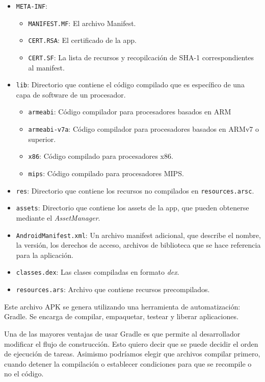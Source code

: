 \begin{itemize}
\item \texttt{META-INF}:
  \begin{itemize}
  \item \texttt{MANIFEST.MF}: El archivo Manifest.
  \item \texttt{CERT.RSA}: El certificado de la app.
  \item \texttt{CERT.SF}: La lista de recursos y recopilcación de SHA-1
    correspondientes al manifest.
  \end{itemize}
\item \texttt{lib}: Directorio que contiene el código compilado que es
  específico de una capa de software de un procesador.
  \begin{itemize}
  \item \texttt{armeabi}: Código compilador para procesadores basados en ARM
  \item \texttt{armeabi-v7a}: Código compilador para procesadores basados en
    ARMv7 o superior.
  \item \texttt{x86}: Código compilado para procesadores x86.
  \item \texttt{mips}: Código compilado para procesadores MIPS.
  \end{itemize}
\item \texttt{res}: Directorio que contiene los recursos no compilados en
  \texttt{resources.arsc}.
\item \texttt{assets}: Directorio que contiene los assets de la app, que pueden
  obtenerse mediante el \textit{AssetManager}.
\item \texttt{AndroidManifest.xml}: Un archivo manifest adicional, que describe
  el nombre, la versión, los derechos de acceso, archivos de biblioteca que se
  hace referencia para la aplicación.
\item \texttt{classes.dex}: Las clases compiladas en formato \textit{dex}.
\item \texttt{resources.ars}: Archivo que contiene recursos precompilados.
\end{itemize}

Este archivo APK se genera utilizando una herramienta de automatización: Gradle.
Se encarga de compilar, empaquetar, testear y liberar aplicaciones.


Una de las mayores ventajas de usar Gradle es que permite al desarrollador
modificar el flujo de construcción. Esto quiero decir que se puede decidir el
orden de ejecución de tareas. Asimismo podríamos elegir que archivos compilar
primero, cuando detener la compilación o establecer condiciones para que se
recompile o no el código.

